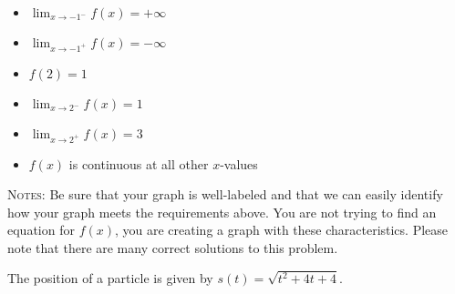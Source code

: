\documentclass[addpoints,12pt]{exam}
\begin{document}
\begin{questions}
\begin{itemize}
\item $\displaystyle{\lim_{x\to -1^{-}} f(x) = +\infty}$
\item $\displaystyle{\lim_{x\to -1^{+}} f(x) = -\infty}$
\item $f(2)=1$
\item $\displaystyle{\lim_{x\to 2^{-}} f(x) = 1}$
\item $\displaystyle{\lim_{x\to 2^{+}} f(x) = 3}$
\item $f(x)$ is continuous at all other $x$-values
\end{itemize}




\noindent\textsc{Notes:} Be sure that your graph is well-labeled and that we can easily identify
how your graph meets the requirements above. You are not trying to find an equation for $f(x)$,
you are creating a graph with these characteristics. Please note that there are many correct
solutions to this problem.

\begin{center}

\end{center}



\vfill

\newpage

\question The position of a particle is given by $s(t) = \sqrt{t^2+4t+4}.$

\end{questions}
\end{document}
